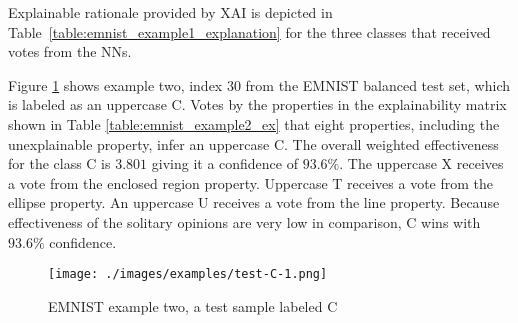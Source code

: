 Explainable rationale provided by XAI is depicted in
Table~\ref{table:emnist_example1_explanation} for the three classes that received
votes from the NNs.

\begin{table}[H]
    \renewcommand{\arraystretch}{1.3}
     \label{table:emnist_example1_explanation}
    \begin{center}
    \end{center}
\end{table}

Figure \ref{fig:ex2} shows example two, index 30 from the EMNIST balanced test
set, which is labeled as an uppercase C. Votes by the properties in the
explainability matrix shown in Table \ref{table:emnist_example2_ex} that eight
properties, including the unexplainable property, infer an uppercase C. The
overall weighted effectiveness for the class C is $3.801$ giving it a confidence
of $93.6\%$. The uppercase X receives a vote from the enclosed region property.
Uppercase T receives a vote from the ellipse property. An uppercase U receives a
vote from the line property.  Because effectiveness of the solitary opinions are
very low in comparison, C wins with $93.6\%$ confidence.

\begin{figure}[H]
    \centering
    \texttt{[image: ./images/examples/test-C-1.png]}
    \caption{EMNIST example two, a test sample labeled C}
    \label{fig:ex2}
\end{figure}

